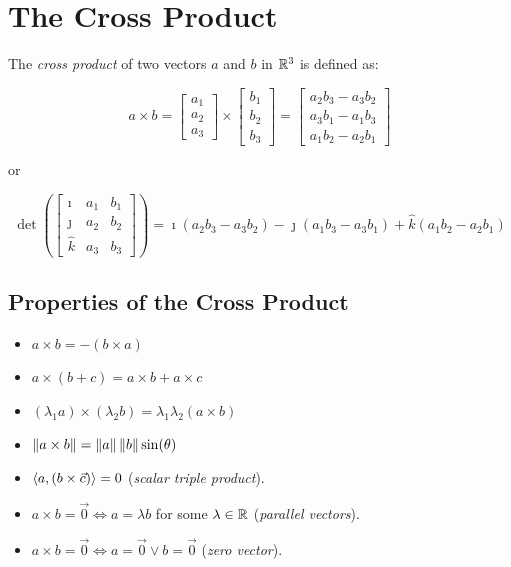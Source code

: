 \section{The Cross Product}

The \emph{cross product} of two vectors \(a\) and \(b\) in \(\mathbb{R}^3\) is defined as:

\[
	a \times b = \begin{bmatrix} a_1 \\ a_2 \\ a_3 \end{bmatrix} \times \begin{bmatrix} b_1 \\ b_2 \\ b_3 \end{bmatrix} = 
	\begin{bmatrix} a_2 b_3 - a_3 b_2 \\ a_3 b_1 - a_1 b_3 \\ a_1 b_2 - a_2 b_1 \end{bmatrix}
\]

or 

\[
	\det\left( \begin{bmatrix}
		\imath & a_1 & b_1 \\
		\jmath & a_2 & b_2 \\
		\hat{k} & a_3 & b_3
	\end{bmatrix} \right)
	= \imath (a_2 b_3 - a_3 b_2) - \jmath (a_1 b_3 - a_3 b_1) + \hat{k}(a_1 b_2 - a_2 b_1)
\]

\subsection{Properties of the Cross Product}

\begin{itemize}

	\item \(a \times b = -(b \times a)\)

	\item \(a \times (b + c) = a \times b + a \times c\)

	\item \((\lambda_1a) \times (\lambda_2b) = \lambda_1\lambda_2(a \times b)\)

	\item \(\left\| a \times b \right\| = \left\| a \right\|\left\| b \right\| \sin(\theta)\)

	\item \(\left\langle a, (b \times \vec{c})\right\rangle = 0\) (\emph{scalar triple product}).

	\item \(a \times b = \vec{0} \Leftrightarrow a = \lambda b\) for some \(\lambda \in \mathbb{R}\) (\emph{parallel vectors}).

	\item \(a \times b = \vec{0} \Leftrightarrow a = \vec{0} \vee b = \vec{0}\) (\emph{zero vector}).

\end{itemize}

